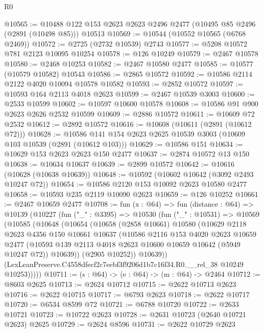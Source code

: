 \begin{lexlean}{R0}
\begin{coremodule}
@10565 := @10488 @122 @153 @2623 @2623 @2496 @2477 (@10495 @85 @2496 (@2891 (@10498 @85))) @10513
@10569 := @10544 (@10552 @10565 (@6768 @2469))
@10572 := @2725 (@2732 @10539) @2743
@10577 := @5208 @10572 @781 @2123 @10095 @10254
@10578 := @126 @10249
@10579 := @2467 @10578
@10580 := @2468 @10253
@10582 := @2467 @10580 @2477
@10585 := @10577 (@10579 @10582) @10543
@10586 := @2865 @10572
@10592 := @10586 @2114 @2122 @4020 @10094 @10578 @10582
@10593 := @2852 @10572
@10597 := @10593 @164 @2113 @4018 @2623
@10599 := @2467 @10539 @3003
@10600 := @2533 @10599
@10602 := @10597 @10600 @10578
@10608 := @10586 @91 @900 @2623 @2626 @2532 @10599
@10609 := @2886 @10572
@10611 := @10609 @72 @2532
@10612 := @2892 @10572
@10616 := @10608 (@10611 (@2891 (@10612 @72)))
@10628 := @10586 @141 @154 @2623 @2625 @10539 @3003 (@10609 @103 @10539 (@2891 (@10612 @103)))
@10629 := @10586 @151
@10634 := @10629 @153 @2623 @2623 @150 @2477
@10637 := @2874 @10572 @13 @150
@10638 := @10634 @10637
@10639 := @2899 @10572
@10642 := @10616 (@10628 (@10638 @10639))
@10648 := @10592 (@10602 @10642 (@3092 @2493 @10247 @72))
@10654 := @10586 @2120 @153 @10092 @2623 @10580 @2477
@10658 := @10593 @235 @2119 @10090 @2623
@10659 := @126 @10252
@10661 := @2467 @10659 @2477
@10708 := fun (x : @64) =>
  fun (distance : @64) =>
  @10139
    (@10227
      (fun ("_" : @3395) =>
      @10530
        (fun ("_" : @10531) =>
        @10569
          (@10585
            (@10648
              (@10654
                (@10658
                  (@2858 @10661)
                  @10580
                  (@10629
                    @2118
                    @2623
                    @4356
                    @150
                    @10661
                    @10637
                    (@10586
                      @2116
                      @153
                      @4020
                      @2623
                      @10659
                      @2477
                      (@10593 @139 @2113 @4018 @2623 @10600 @10659 @10642 (@5949 @10247 @72))
                      @10639))
                  (@2905 @10252))
                @10639))
            (LexLeanPreserve.C4558dfecf2c7eebf3f9206d1b7c16f34.R0.__rel_38 @10249 @10253)))))
@10711 := (s : @64) -> (e : @64) -> (m : @64) -> @2464
@10712 := @8603 @2625
@10713 := @2624 @10712
@10715 := @2622 @10713 @2623
@10716 := @2622 @10715
@10717 := @6793 @2623
@10718 := @2622 @10717
@10720 := @6534 @8599 @72
@10721 := @6788 @10720
@10722 := @2633 @10721
@10723 := @10722 @2623
@10728 := @2631 @10723 (@2640 @10721 @2623) @2625
@10729 := @2624 @8596
@10731 := @2622 @10729 @2623

\end{coremodule}
\end{lexlean}
